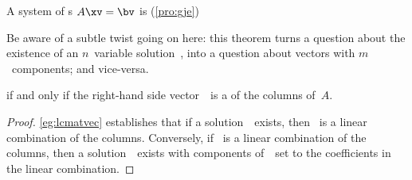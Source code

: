 \begin{theorem} \label{thm:conlincom} 
A system of s \(A\xv=\bv\) is  (\autoref{pro:gje}) 
\begin{aside}
Be aware of a subtle twist going on here: this theorem turns a question about the existence of an \(n\)~variable solution~\xv, into a question about vectors with \(m\)~components; and vice-versa.
\end{aside}
if and only if the right-hand side vector~\bv\ is a  of the columns of~\(A\).
\end{theorem}

\begin{proof} 
\autoref{eg:lcmatvec} establishes that if a solution~\xv\ exists, then \bv~is a linear combination of the columns.
Conversely, if \bv~is a linear combination of the columns, then a solution~\xv\ exists with components of~\xv\ set to the coefficients in the linear combination.
\end{proof}


